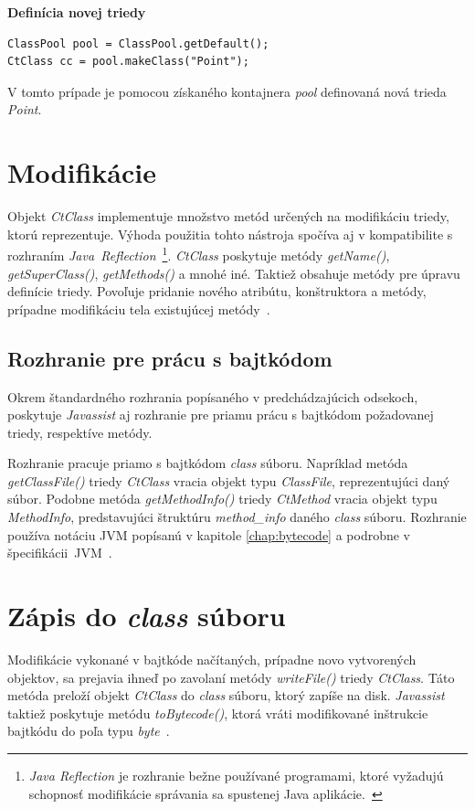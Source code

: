 \documentclass[11pt,final,oneside]{fithesis}
\newenvironment{example}[1]
{
\vspace{3mm}
\noindent\textbf{#1}
\vspace{2mm}
}
{
\vspace{3mm}
}
\begin{document}
\begin{example}{Definícia novej triedy}
\begin{verbatim}
ClassPool pool = ClassPool.getDefault();
CtClass cc = pool.makeClass("Point");
\end{verbatim}
\end{example}

V tomto prípade je pomocou získaného kontajnera \textit{pool} definovaná nová 
trieda \textit{Point}. 

\section{Modifikácie}
\label{sec:mod}
Objekt \textit{CtClass} implementuje množstvo metód určených na modifikáciu triedy, 
ktorú reprezentuje. Výhoda použitia tohto nástroja spočíva aj v kompatibilite 
s rozhraním \textit{Java~Reflection}~\footnote{\textit{Java Reflection} je 
rozhranie bežne používané programami, ktoré vyžadujú schopnosť modifikácie 
správania sa spustenej Java aplikácie.~\cite{Oracle:JavaReflection}}.
\textit{CtClass} poskytuje metódy \textit{getName()}, \textit{getSuperClass()},
\textit{getMethods()} a mnohé iné. Taktiež obsahuje metódy pre úpravu definície
triedy. Povoľuje pridanie nového atribútu, konštruktora a metódy, prípadne 
modifikáciu tela existujúcej metódy~\cite{Chiba:Javassist}.

\subsection{Rozhranie pre prácu s bajtkódom}
Okrem štandardného rozhrania popísaného v predchádzajúcich odsekoch, poskytuje 
\textit{Javassist} aj rozhranie pre priamu prácu s bajtkódom požadovanej 
triedy, respektíve metódy.

Rozhranie pracuje priamo s bajtkódom \textit{class} súboru. Napríklad metóda 
\textit{getClassFile()} triedy \textit{CtClass} vracia objekt typu 
\textit{ClassFile}, reprezentujúci daný súbor. Podobne metóda 
\textit{getMethodInfo()} triedy \textit{CtMethod} vracia objekt typu
\textit{MethodInfo}, predstavujúci štruktúru \textit{method\_info} daného 
\textit{class} súboru. Rozhranie používa notáciu JVM popísanú v kapitole 
\ref{chap:bytecode} a podrobne v
špecifikácii~JVM~\cite{Lindholm:2013:JVM:2462629}.

\section{Zápis do \textit{class} súboru}
Modifikácie vykonané v bajtkóde načítaných, prípadne novo vytvorených 
objektov, sa prejavia ihneď po zavolaní metódy \textit{writeFile()} triedy
\textit{CtClass}. Táto metóda preloží objekt \textit{CtClass} do \textit{class}
súboru, ktorý zapíše na disk. \textit{Javassist} taktiež poskytuje metódu 
\textit{toBytecode()}, ktorá vráti modifikované inštrukcie bajtkódu do poľa 
typu \textit{byte}~\cite{Chiba:Javassist}.
\end{document}
